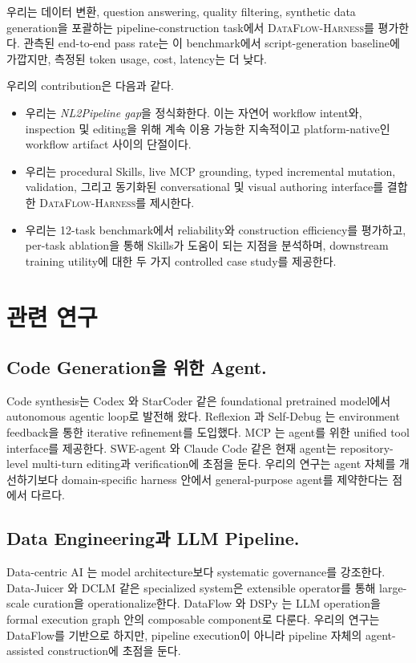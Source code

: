 우리는 데이터 변환, question answering, quality filtering, synthetic data generation을 포괄하는 pipeline-construction task에서 \textsc{DataFlow-Harness}를 평가한다. 관측된 end-to-end pass rate는 이 benchmark에서 script-generation baseline에 가깝지만, 측정된 token usage, cost, latency는 더 낮다.

우리의 contribution은 다음과 같다.

\begin{itemize}
\item 우리는 \textit{NL2Pipeline gap}을 정식화한다. 이는 자연어 workflow intent와, inspection 및 editing을 위해 계속 이용 가능한 지속적이고 platform-native인 workflow artifact 사이의 단절이다.

\item 우리는 procedural Skills, live MCP grounding, typed incremental mutation, validation, 그리고 동기화된 conversational 및 visual authoring interface를 결합한 \textsc{DataFlow-Harness}를 제시한다.

\item 우리는 12-task benchmark에서 reliability와 construction efficiency를 평가하고, per-task ablation을 통해 Skills가 도움이 되는 지점을 분석하며, downstream training utility에 대한 두 가지 controlled case study를 제공한다.

\end{itemize}


\section{관련 연구}

\subsection{Code Generation을 위한 Agent.}
Code synthesis는 Codex \citep{chen2021codex}와 StarCoder \citep{li2023starcoder} 같은 foundational pretrained model에서 autonomous agentic loop로 발전해 왔다. Reflexion \citep{shinn2023reflexion}과 Self-Debug \citep{chen2023selfdebug}는 environment feedback을 통한 iterative refinement를 도입했다. MCP \citep{anthropic2024mcp}는 agent를 위한 unified tool interface를 제공한다. SWE-agent \citep{yang2024swe}와 Claude Code \citep{anthropic2024claude} 같은 현재 agent는 repository-level multi-turn editing과 verification에 초점을 둔다. 우리의 연구는 agent 자체를 개선하기보다 domain-specific harness 안에서 general-purpose agent를 제약한다는 점에서 다르다.

\subsection{Data Engineering과 LLM Pipeline.}
Data-centric AI \citep{zha2023datacentric}는 model architecture보다 systematic governance를 강조한다. Data-Juicer \citep{chen2023datajuicer}와 DCLM \citep{apple2024dclm} 같은 specialized system은 extensible operator를 통해 large-scale curation을 operationalize한다. DataFlow \citep{dataflow2025}와 DSPy \citep{khattab2024dspy}는 LLM operation을 formal execution graph 안의 composable component로 다룬다. 우리의 연구는 DataFlow를 기반으로 하지만, pipeline execution이 아니라 pipeline 자체의 agent-assisted construction에 초점을 둔다.

